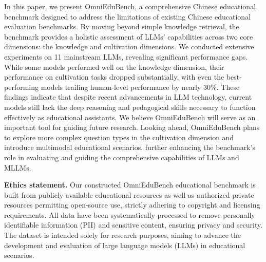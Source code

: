 \documentclass{article} %
\begin{document}
In this paper, we present OmniEduBench, a comprehensive Chinese educational benchmark designed to address the limitations of existing Chinese educational evaluation benchmarks. By moving beyond simple knowledge retrieval, the benchmark provides a holistic assessment of LLMs’ capabilities across two core dimensions: the knowledge and cultivation dimensions. We conducted extensive experiments on 11 mainstream LLMs, revealing significant performance gaps. While some models performed well on the knowledge dimension, their performance on cultivation tasks dropped substantially, with even the best-performing models trailing human-level performance by nearly 30\%. These findings indicate that despite recent advancements in LLM technology, current models still lack the deep reasoning and pedagogical skills necessary to function effectively as educational assistants. We believe OmniEduBench will serve as an important tool for guiding future research. Looking ahead, OmniEduBench plans to explore more complex question types in the cultivation dimension and introduce multimodal educational scenarios, further enhancing the benchmark’s role in evaluating and guiding the comprehensive capabilities of LLMs and MLLMs.





\newpage


\textbf{Ethics statement.}
Our constructed OmniEduBench educational benchmark is built from publicly available educational resources as well as authorized private resources permitting open-source use, strictly adhering to copyright and licensing requirements. All data have been systematically processed to remove personally identifiable information (PII) and sensitive content, ensuring privacy and security. The dataset is intended solely for research purposes, aiming to advance the development and evaluation of large language models (LLMs) in educational scenarios.
\end{document}
